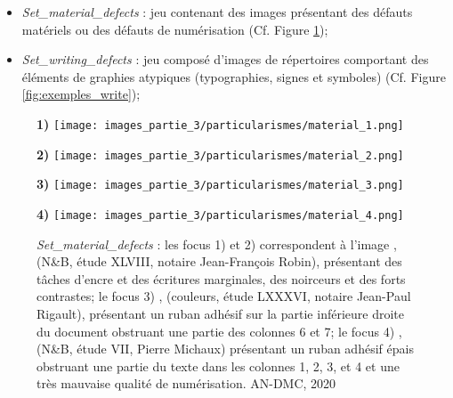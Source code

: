 \begin{itemize}
    \item \textit{Set\_material\_defects} : jeu contenant des images présentant des défauts matériels ou des défauts de numérisation (Cf. Figure \ref{fig:exemples_material});
    \item \textit{Set\_writing\_defects} : jeu composé d'images de répertoires comportant des éléments de graphies atypiques (typographies, signes et symboles) (Cf. Figure \ref{fig:exemples_write});
\end{itemize}
\newpage
\begin{figure}[H]
    \begin{minipage}[c]{.46\linewidth} 
        \centering
        \textbf{1)}
        \texttt{[image: images\_partie\_3/particularismes/material\_1.png]}
        \end{minipage}
    \hfill%
    \begin{minipage}[c]{.46\linewidth}
        \centering
        \textbf{2)}
        \texttt{[image: images\_partie\_3/particularismes/material\_2.png]}
    \end{minipage}
    \hfill%
    \begin{minipage}[c]{.46\linewidth}
        \centering
        \textbf{3)}
        \texttt{[image: images\_partie\_3/particularismes/material\_3.png]}
    \end{minipage}
    \hfill%
    \begin{minipage}[c]{.46\linewidth}
        \centering
        \textbf{4)}
        \texttt{[image: images\_partie\_3/particularismes/material\_4.png]}
    \end{minipage}
        \caption{\textit{Set\_material\_defects} : les focus 1) et 2) correspondent à l'image , (N\&B, étude XLVIII, notaire Jean-François Robin), présentant des tâches d'encre et des écritures marginales, des noirceurs et des forts contrastes; le focus 3) 
        , (couleurs, étude LXXXVI, notaire Jean-Paul Rigault), 
        présentant un ruban adhésif sur la partie inférieure droite du document obstruant une partie des colonnes 6 et 7; le focus 4)
        , (N\&B, étude VII, Pierre Michaux) présentant un ruban adhésif épais obstruant une partie du texte dans les colonnes 1, 2, 3, et 4 et une très mauvaise qualité de numérisation.
        \textcopyright AN-DMC, 2020}
    \label{fig:exemples_material}
\end{figure}

